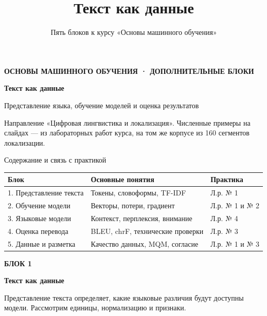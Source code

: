 \documentclass[aspectratio=169,12pt]{beamer}
\title{Текст как данные}
\subtitle{Пять блоков к курсу «Основы машинного обучения»}
\date{}
\author{}
\newcommand{\пр}{\kern0.04em\vrule height0.45ex depth0pt width0.06em%
  \vrule height0.06em depth0pt width0.42em\vrule height0.45ex depth0pt width0.06em\kern0.04em}
\newcommand{\формула}[1]{\par\vspace{0.25em}{\centering$\displaystyle #1$\par}\vspace{0.25em}}
\newcommand{\блок}[3]{%
  \vspace{1.4cm}
  {\color{brick}\small\bfseries БЛОК #1\par}
  \vspace{0.6cm}
  {\color{navy}\fontsize{28}{32}\selectfont\bfseries #2\par}
  \vspace{0.6cm}
  {\color{ink}\large #3\par}}
\begin{document}
\begin{frame}[plain]
  \vspace{1.2cm}
  {\color{brick}\small\bfseries ОСНОВЫ МАШИННОГО ОБУЧЕНИЯ · ДОПОЛНИТЕЛЬНЫЕ БЛОКИ}

  \vspace{0.7cm}
  {\color{navy}\fontsize{30}{34}\selectfont\bfseries Текст как данные\par}

  \vspace{0.5cm}
  {\color{ink}\large Представление языка, обучение моделей и оценка результатов\par}

  \vspace{1.0cm}
  {\color{ash} Направление «Цифровая лингвистика и локализация». Численные примеры
   на слайдах — из лабораторных работ курса, на том же корпусе из 160
   сегментов локализации.\par}
\end{frame}

\begin{frame}{Содержание и связь с практикой}
\color{ink}
{\small\renewcommand{\arraystretch}{1.15}\begin{tabular}{@{}Л{0.3} Л{0.4} Л{0.22}@{}}\toprule
Блок & Основные понятия & Практика\\. Представление текста & Токены, словоформы, TF-IDF & Л.р. № 1\\[0.3em]
2. Обучение модели & Векторы, потери, градиент & Л.р. № 1 и № 2\\[0.3em]
3. Языковые модели & Контекст, перплексия, внимание & Л.р. № 4\\[0.3em]
4. Оценка перевода & BLEU, chrF, технические проверки & Л.р. № 3\\[0.3em]
5. Данные и разметка & Качество данных, MQM, согласие & Л.р. № 1 и № 3\\[0.3em]\bottomrule\end{tabular}}
\end{frame}

\begin{frame}[plain]
  \блок{1}{Текст как данные}{Представление текста определяет, какие языковые различия будут доступны модели. Рассмотрим единицы, нормализацию и признаки.}
\end{frame}
\end{document}
